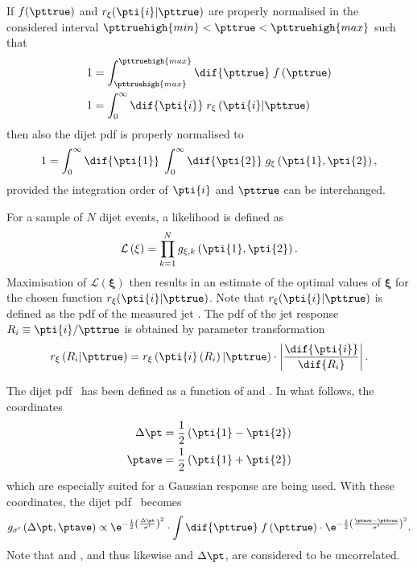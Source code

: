 If $f(\pttrue)$ and $r_{\mathbf{\xi}}(\pti{i}|\pttrue)$ are properly normalised in the considered interval \mbox{$\pttruehigh{min} < \pttrue < \pttruehigh{max}$} such that
\begin{align}
  \begin{split}
    1 & = \int^{\pttruehigh{max}}_{\pttruehigh{max}}\dif{\pttrue}\;f\left(\pttrue\right) \\
    1 & = \int^{\infty}_{0}\dif{\pti{i}}\;r_{\mathbf{\xi}}\left(\pti{i}|\pttrue\right)
  \end{split}
\end{align}
then also the dijet pdf is properly normalised to
\begin{equation*}
  1 = \int^{\infty}_{0}\dif{\pti{1}}\;\int^{\infty}_{0}\dif{\pti{2}}\; g_{\mathbf{\xi}}\left(\pti{1},\pti{2}\right),
\end{equation*}
provided the integration order of $\pti{i}$ and $\pttrue$ can be interchanged.

For a sample of $N$ dijet events, a likelihood is defined as
\begin{equation}
  \label{eq:ResFit:Likelihood}
  \mathcal{L}\left(\mathbf{\xi}\right) = \prod^{N}_{k=1} g_{\mathbf{\xi},k}\left(\pti{1},\pti{2}\right).
\end{equation}
Maximisation of $\mathcal{L}(\mathbf{\xi})$ then results in an
estimate of the optimal values of $\mathbf{\xi}$ for the chosen
function $r_{\mathbf{\xi}}(\pti{i}|\pttrue)$.
Note that $r_{\mathbf{\xi}}(\pti{i}|\pttrue)$ is defined as the
pdf of the measured jet \pt.
The pdf of the jet \pt response \mbox{$R_{i}\equiv\pti{i} / \pttrue$} is obtained by parameter transformation
\begin{equation*}
  r_{\mathbf{\xi}}\left(R_{i}|\pttrue\right) =
  r_{\mathbf{\xi}}\left(\pti{i}\left(R_{i}\right)|\pttrue\right)\cdot\left|\frac{\dif{\pti{i}}}{\dif{R_{i}}}\right|.
\end{equation*}


The dijet pdf~ has been defined as a function
of  and .
In what follows, the coordinates
\begin{align}
  \label{eq:ResFit:TransformedCoordinates}
  \begin{split}
    \Delta\pt  &  = \frac{1}{2}\left(\pti{1}-\pti{2}\right) \\
    \ptave     &  = \frac{1}{2}\left(\pti{1}+\pti{2}\right)
  \end{split}
\end{align} 
which are especially suited for a Gaussian response are being used.
With these coordinates, the dijet pdf~ becomes
\begin{equation}
  \label{eq:ResFit:DijetPdfTransformed}
   g_{\sigma'}\left(\Delta\pt,\ptave\right) \propto
   \e^{-\frac{1}{2}\left(\frac{\Delta\pt}{\sigma'}\right)^{2}}\cdot
   \int\dif{\pttrue}\;f\left(\pttrue\right)\cdot
   \e^{-\frac{1}{2}\left(\frac{\ptave - \pttrue}{\sigma'}\right)^{2}}.
\end{equation}
Note that  and , and thus likewise \ptave and $\Delta\pt$, are considered to be uncorrelated.
